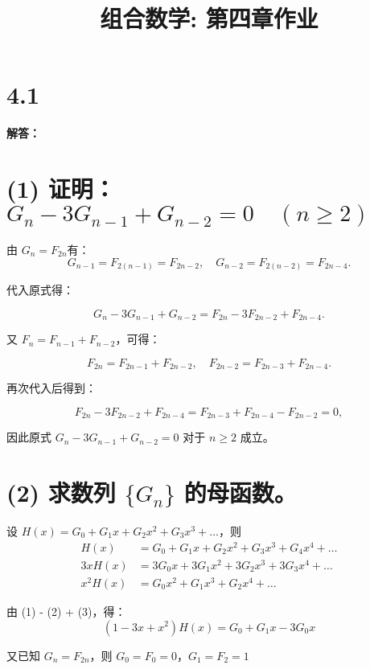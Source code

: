 \documentclass{article}
\title{组合数学: 第四章作业}
\begin{document}
\maketitle

\section*{4.1}

\textbf{解答：}

    \section*{(1) 证明：\( G_n - 3G_{n-1} + G_{n-2} = 0 \quad (n \geq 2) \)}
    
    
    由 \( G_n = F_{2n} \)有：
    \[
    G_{n-1} = F_{2(n-1)} = F_{2n-2}, \quad G_{n-2} = F_{2(n-2)} = F_{2n-4}.
    \]
    
    代入原式得：
    
    \[
    G_n - 3G_{n-1} + G_{n-2} = F_{2n} - 3F_{2n-2} + F_{2n-4}.
    \]
    
    又 \( F_n = F_{n-1} + F_{n-2} \)，可得：
    
    \[
    F_{2n} = F_{2n-1} + F_{2n-2}, \quad F_{2n-2} = F_{2n-3} + F_{2n-4}.
    \]
    
    再次代入后得到：
    
    \[
    F_{2n} - 3F_{2n-2} + F_{2n-4} = F_{2n-3} + F_{2n-4} - F_{2n-2} = 0,
    \]
    
    因此原式 \( G_n - 3G_{n-1} + G_{n-2} = 0 \) 对于 \( n \geq 2 \) 成立。

    \section*{(2) 求数列 \( \{G_n\} \) 的母函数。}
    
    设 $H(x) = G_0 + G_1 x + G_2 x^2 + G_3 x^3 + \dots$，则
    \begin{align}
    H(x) &= G_0 + G_1 x + G_2 x^2 + G_3 x^3 + G_4 x^4 + \dots \tag{1} \\
    3xH(x) &= 3G_0 x + 3G_1 x^2 + 3G_2 x^3 + 3G_3 x^4 + \dots \tag{2} \\
    x^2 H(x) &= G_0 x^2 + G_1 x^3 + G_2 x^4 + \dots \tag{3}
    \end{align}
    
    \noindent
    由 (1) - (2) + (3)，得：
    \[
    (1 - 3x + x^2) H(x) = G_0 + G_1 x - 3G_0 x
    \]
    
    \noindent
    又已知 $G_n = F_{2n}$，则 $G_0 = F_0 = 0$，$G_1 = F_2 = 1$
    
\end{document}
